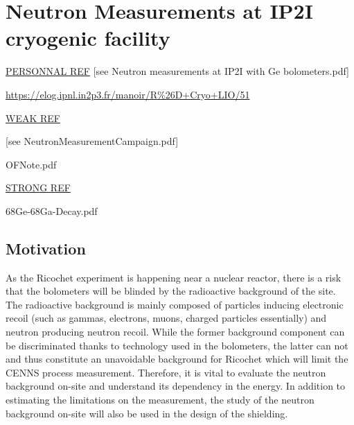 
\chapter{Neutron Measurements at IP2I cryogenic facility} %

\label{ChapterNeutron} %


\underline{PERSONNAL REF}
{\color{red}[see Neutron measurements at IP2I with Ge
bolometers.pdf]}

\href{https://elog.ipnl.in2p3.fr/manoir/R%26D+Cryo+LIO/51}{https://elog.ipnl.in2p3.fr/manoir/R\%26D+Cryo+LIO/51}

\underline{WEAK REF}

{\color{red}[see NeutronMeasurementCampaign.pdf]}

OFNote.pdf

\underline{STRONG REF}

68Ge-68Ga-Decay.pdf




\section{Motivation}

As the Ricochet experiment is happening near a nuclear reactor, there is a risk that the bolometers will be blinded by the radioactive background of the site.
The radioactive background is mainly composed of particles inducing electronic recoil (such as gammas, electrons, muons, charged particles essentially) and neutron producing neutron recoil.
While the former background component can be discriminated thanks to technology used in the bolometers, the latter can not and thus constitute an unavoidable background for Ricochet which will limit the CENNS process measurement.
Therefore, it is vital to evaluate the neutron background on-site and understand its dependency in the energy.
In addition to estimating the limitations on the measurement, the study of the neutron background on-site will also be used in the design of the shielding.

